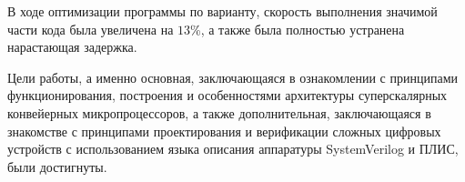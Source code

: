 
В ходе оптимизации программы по варианту, скорость выполнения значимой части кода была увеличена на $13$\%, а также была полностью устранена нарастающая задержка.

Цели работы, а именно основная, заключающаяся в ознакомлении с принципами функционирования, построения и особенностями архитектуры суперскалярных конвейерных микропроцессоров, а также дополнительная, заключающаяся в знакомстве с принципами проектирования и верификации сложных цифровых устройств с использованием языка описания аппаратуры SystemVerilog и ПЛИС, были достигнуты.